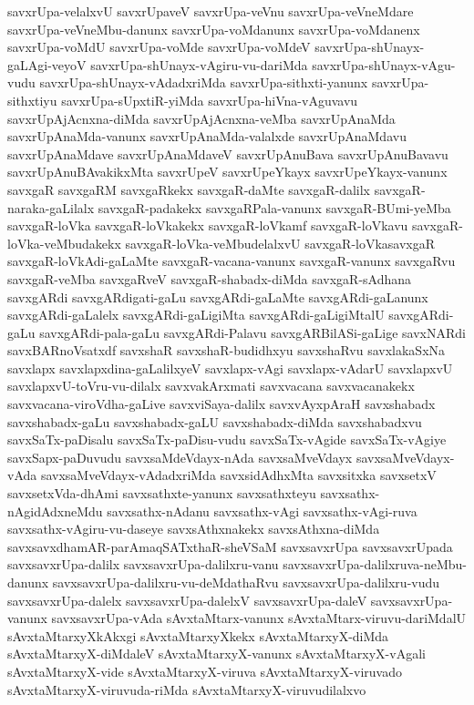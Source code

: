 {savxrUpa-velalxvU
savxrUpaveV
savxrUpa-veVnu
savxrUpa-veVneMdare
savxrUpa-veVneMbu-danunx
savxrUpa-voMdanunx
savxrUpa-voMdanenx
savxrUpa-voMdU
savxrUpa-voMde
savxrUpa-voMdeV
savxrUpa-shUnayx-gaLAgi-veyoV
savxrUpa-shUnayx-vAgiru-vu-dariMda
savxrUpa-shUnayx-vAgu-vudu
savxrUpa-shUnayx-vAdadxriMda
savxrUpa-sithxti-yanunx
savxrUpa-sithxtiyu
savxrUpa-sUpxtiR-yiMda
savxrUpa-hiVna-vAguvavu
savxrUpAjAcnxna-diMda
savxrUpAjAcnxna-veMba
savxrUpAnaMda
savxrUpAnaMda-vanunx
savxrUpAnaMda-valalxde
savxrUpAnaMdavu
savxrUpAnaMdave
savxrUpAnaMdaveV
savxrUpAnuBava
savxrUpAnuBavavu
savxrUpAnuBAvakikxMta
savxrUpeV
savxrUpeYkayx
savxrUpeYkayx-vanunx
savxgaR
savxgaRM
savxgaRkekx
savxgaR-daMte
savxgaR-dalilx
savxgaR-naraka-gaLilalx
savxgaR-padakekx
savxgaRPala-vanunx
savxgaR-BUmi-yeMba
savxgaR-loVka
savxgaR-loVkakekx
savxgaR-loVkamf
savxgaR-loVkavu
savxgaR-loVka-veMbudakekx
savxgaR-loVka-veMbudelalxvU
savxgaR-loVkasavxgaR
savxgaR-loVkAdi-gaLaMte
savxgaR-vacana-vanunx
savxgaR-vanunx
savxgaRvu
savxgaR-veMba
savxgaRveV
savxgaR-shabadx-diMda
savxgaR-sAdhana
savxgARdi
savxgARdigati-gaLu
savxgARdi-gaLaMte
savxgARdi-gaLanunx
savxgARdi-gaLalelx
savxgARdi-gaLigiMta
savxgARdi-gaLigiMtalU
savxgARdi-gaLu
savxgARdi-pala-gaLu
savxgARdi-Palavu
savxgARBilASi-gaLige
savxNARdi
savxBARnoVsatxdf
savxshaR
savxshaR-budidhxyu
savxshaRvu
savxlakaSxNa
savxlapx
savxlapxdina-gaLalilxyeV
savxlapx-vAgi
savxlapx-vAdarU
savxlapxvU
savxlapxvU-toVru-vu-dilalx
savxvakArxmati
savxvacana
savxvacanakekx
savxvacana-viroVdha-gaLive
savxviSaya-dalilx
savxvAyxpAraH
savxshabadx
savxshabadx-gaLu
savxshabadx-gaLU
savxshabadx-diMda
savxshabadxvu
savxSaTx-paDisalu
savxSaTx-paDisu-vudu
savxSaTx-vAgide
savxSaTx-vAgiye
savxSapx-paDuvudu
savxsaMdeVdayx-nAda
savxsaMveVdayx
savxsaMveVdayx-vAda
savxsaMveVdayx-vAdadxriMda
savxsidAdhxMta
savxsitxka
savxsetxV
savxsetxVda-dhAmi
savxsathxte-yanunx
savxsathxteyu
savxsathx-nAgidAdxneMdu
savxsathx-nAdanu
savxsathx-vAgi
savxsathx-vAgi-ruva
savxsathx-vAgiru-vu-daseye
savxsAthxnakekx
savxsAthxna-diMda
savxsavxdhamAR-parAmaqSATxthaR-sheVSaM
savxsavxrUpa
savxsavxrUpada
savxsavxrUpa-dalilx
savxsavxrUpa-dalilxru-vanu
savxsavxrUpa-dalilxruva-neMbu-danunx
savxsavxrUpa-dalilxru-vu-deMdathaRvu
savxsavxrUpa-dalilxru-vudu
savxsavxrUpa-dalelx
savxsavxrUpa-dalelxV
savxsavxrUpa-daleV
savxsavxrUpa-vanunx
savxsavxrUpa-vAda
sAvxtaMtarx-vanunx
sAvxtaMtarx-viruvu-dariMdalU
sAvxtaMtarxyXkAkxgi
sAvxtaMtarxyXkekx
sAvxtaMtarxyX-diMda
sAvxtaMtarxyX-diMdaleV
sAvxtaMtarxyX-vanunx
sAvxtaMtarxyX-vAgali
sAvxtaMtarxyX-vide
sAvxtaMtarxyX-viruva
sAvxtaMtarxyX-viruvado
sAvxtaMtarxyX-viruvuda-riMda
sAvxtaMtarxyX-viruvudilalxvo
}

